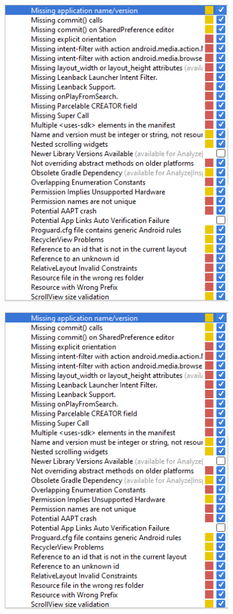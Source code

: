 \begin{figure}[H]
  		\centering
      	\includegraphics[width=100mm]{Capture13}	      	
  		\caption{}
\end{figure}

\begin{figure}[H]
  		\centering
      	\includegraphics[width=100mm]{Capture14}	      	
  		\caption{}
\end{figure}

